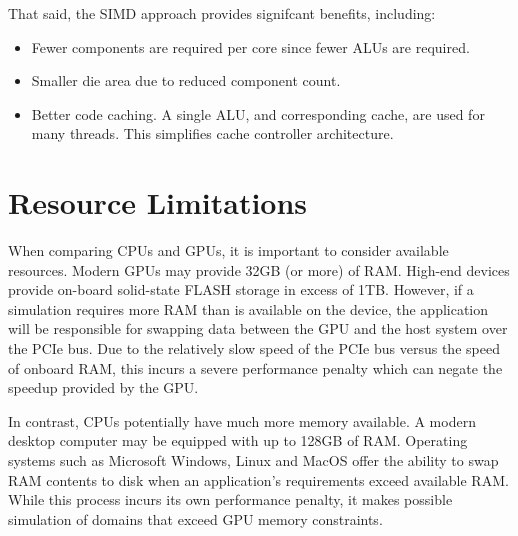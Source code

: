 That said, the SIMD approach provides signifcant benefits, including:

\begin{itemize}
	\item Fewer components are required per core since fewer ALUs are required.
	\item Smaller die area due to reduced component count.
	\item Better code caching. A single ALU, and corresponding cache, are used for many threads. This simplifies cache controller architecture.
\end{itemize}

\section{Resource Limitations}

When comparing CPUs and GPUs, it is important to consider available resources. Modern GPUs may provide 32GB (or more) of RAM.  High-end devices provide on-board solid-state FLASH storage in excess of 1TB. However, if a simulation requires more RAM than is available on the device, the application will be responsible for swapping data between the GPU and the host system over the PCIe bus. Due to the relatively slow speed of the PCIe bus versus the speed of onboard RAM, this incurs a severe performance penalty which can negate the speedup provided by the GPU. 

In contrast, CPUs potentially have much more memory available. A modern desktop computer may be equipped with up to 128GB of RAM. Operating systems such as Microsoft Windows, Linux and MacOS offer the ability to swap RAM contents to disk when an application's requirements exceed available RAM. While this process incurs its own performance penalty, it makes possible simulation of domains that exceed GPU memory constraints.





